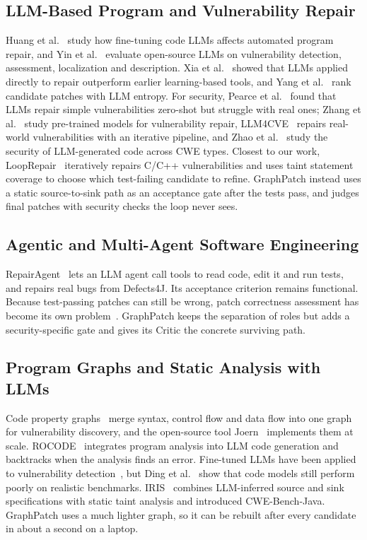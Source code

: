 \documentclass[conference]{IEEEtran}
\begin{document}
\subsection{LLM-Based Program and Vulnerability Repair}
Huang et al.~\cite{huang2025finetune} study how fine-tuning code LLMs affects automated
program repair, and Yin et al.~\cite{yin2024multitask} evaluate open-source LLMs on
vulnerability detection, assessment, localization and description. Xia et
al.~\cite{xia2023apr} showed that LLMs applied directly to repair outperform earlier
learning-based tools, and Yang et al.~\cite{yang2025unnatural} rank candidate patches
with LLM entropy. For security, Pearce et al.~\cite{pearce2023zeroshot} found that LLMs
repair simple vulnerabilities zero-shot but struggle with real ones; Zhang et
al.~\cite{zhang2024pretrained} study pre-trained models for vulnerability repair,
LLM4CVE~\cite{fakih2025llm4cve} repairs real-world vulnerabilities with an iterative
pipeline, and Zhao et al.~\cite{zhao2025secure} study the security of LLM-generated code
across CWE types. Closest to our work, LoopRepair~\cite{ye2026looprepair} iteratively
repairs C/C++ vulnerabilities and uses taint statement coverage to choose which
test-failing candidate to refine. GraphPatch instead uses a static source-to-sink path as
an acceptance gate after the tests pass, and judges final patches with security checks
the loop never sees.

\subsection{Agentic and Multi-Agent Software Engineering}
RepairAgent~\cite{bouzenia2025repairagent} lets an LLM agent call tools to read code,
edit it and run tests, and repairs real bugs from Defects4J. Its acceptance criterion
remains functional. Because test-passing patches can still be wrong, patch correctness
assessment has become its own problem~\cite{zhou2024patchcorrect}. GraphPatch keeps the
separation of roles but adds a security-specific gate and gives its Critic the concrete
surviving path.

\subsection{Program Graphs and Static Analysis with LLMs}
Code property graphs~\cite{yamaguchi2014cpg} merge syntax, control flow and data flow
into one graph for vulnerability discovery, and the open-source tool Joern~\cite{joern}
implements them at scale. ROCODE~\cite{jiang2025rocode} integrates program analysis into
LLM code generation and backtracks when the analysis finds an error. Fine-tuned LLMs
have been applied to vulnerability detection~\cite{shestov2025finetune}, but Ding et
al.~\cite{ding2025vulndetect} show that code models still perform poorly on realistic
benchmarks. IRIS~\cite{li2025iris} combines LLM-inferred source and sink specifications
with static taint analysis and introduced CWE-Bench-Java. GraphPatch uses a much lighter
graph, so it can be rebuilt after every candidate in about a second on a laptop.
\end{document}
